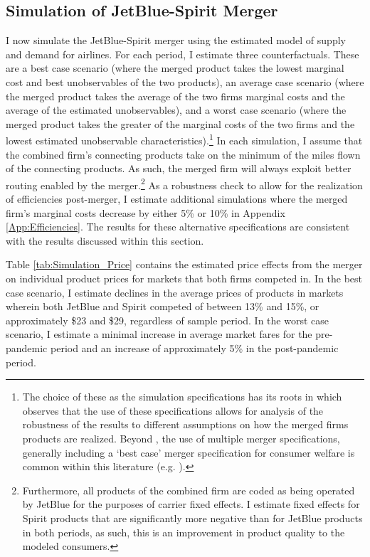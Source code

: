 \documentclass{article}
\begin{document}
	\subsection{Simulation of JetBlue-Spirit Merger}
	\label{sec:Analysis_Merger}
	I now simulate the JetBlue-Spirit merger using the estimated model of supply and demand for airlines. For each period, I estimate three counterfactuals. These are a best case scenario (where the merged product takes the lowest marginal cost and best unobservables of the two products), an average case scenario (where the merged product takes the average of the two firms marginal costs and the average of the estimated unobservables), and a worst case scenario (where the merged product takes the greater of the marginal costs of the two firms and the lowest estimated unobservable characteristics).\footnote{The choice of these as the simulation specifications has its roots in \citet{ciliberto_market_2021} which observes that the use of these specifications allows for analysis of the robustness of the results to different assumptions on how the merged firms products are realized. Beyond \citet{ciliberto_market_2021}, the use of multiple merger specifications, generally including a `best case' merger specification for consumer welfare is common within this literature (e.g. \citet{li_repositioning_2022}).} In each simulation, I assume that the combined firm's connecting products take on the minimum of the miles flown of the connecting products. As such, the merged firm will always exploit better routing enabled by the merger.\footnote{Furthermore, all products of the combined firm are coded as being operated by JetBlue for the purposes of carrier fixed effects. I estimate fixed effects for Spirit products that are significantly more negative than for JetBlue products in both periods, as such, this is an improvement in product quality to the modeled consumers.} As a robustness check to allow for the realization of efficiencies post-merger, I estimate additional simulations where the merged firm's marginal costs decrease by either 5\% or 10\% in Appendix \ref{App:Efficiencies}. The results for these alternative specifications are consistent with the results discussed within this section.

     
	Table \ref{tab:Simulation_Price} contains the estimated price effects from the merger on individual product prices for markets that both firms competed in. In the best case scenario, I estimate declines in the average prices of products in markets wherein both JetBlue and Spirit competed of between 13\% and 15\%, or approximately \$23 and \$29, regardless of sample period. In the worst case scenario, I estimate a minimal increase in average market fares for the pre-pandemic period and an increase of approximately 5\% in the post-pandemic period. 
     
\end{document}
